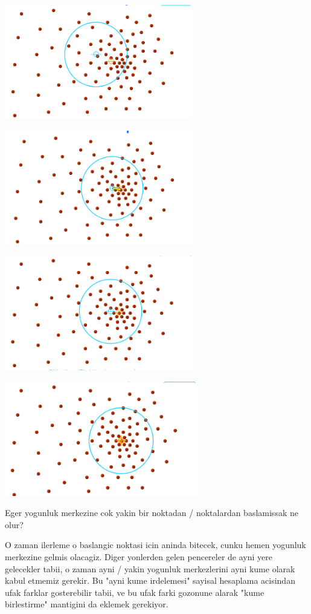 \documentclass[12pt,fleqn]{article}\usepackage{../common}
\begin{document}
\includegraphics[height=5cm]{mean_4.png}

\includegraphics[height=5cm]{mean_5.png}

\includegraphics[height=5cm]{mean_6.png}

\includegraphics[height=5cm]{mean_7.png}

Eger yogunluk merkezine cok yakin bir noktadan / noktalardan
baslamissak ne olur?

O zaman ilerleme o baslangic noktasi icin aninda bitecek, cunku hemen
yogunluk merkezine gelmis olacagiz. Diger yonlerden gelen pencereler
de ayni yere gelecekler tabii, o zaman ayni / yakin yogunluk
merkezlerini ayni kume olarak kabul etmemiz gerekir. Bu "ayni kume
irdelemesi" sayisal hesaplama acisindan ufak farklar gosterebilir
tabii, ve bu ufak farki gozonune alarak "kume birlestirme" mantigini da
eklemek gerekiyor.
\end{document}
